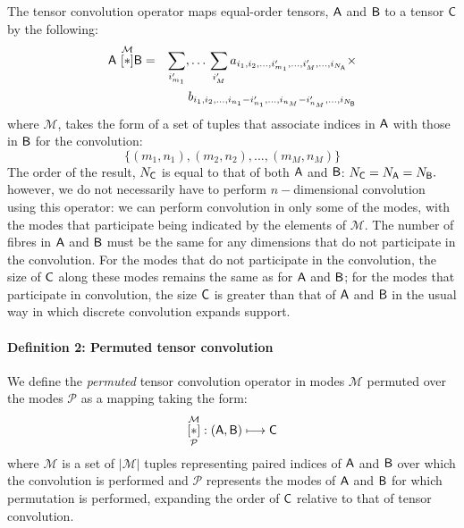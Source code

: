 The tensor convolution operator maps equal-order tensors, $\mathsf{A}$ and $\mathsf{B}$ to a tensor $\mathsf{C}$ by the following:
\begin{eqnarray}
\mathsf{A} \,\, \overset{\mathcal{M}}{[ \ast ]}{\mathsf{B}} &=& \sum_{i'_{m_1}},\ldots\,\sum_{i_{M}'}   a_{i_1,i_2,...,i_{m_1}',...,i_{M}',...,i_{N_{\mathsf{A}}}} \times \nonumber \\
& &b_{i_1,i_2,...,i_{n_1}-i_{n_1}',...,i_{n_M}-i_{n_M}',...,i_{N_{\mathsf{B}}}}
\label{eq:t1}
\end{eqnarray}
where $\mathcal{M}$, takes the form of a set of tuples that associate indices in $\mathsf{A}$ with those in $\mathsf{B}$ for the convolution:
\[
\lbrace(m_1,n_1),(m_2,n_2),...,(m_{M},n_{M})\rbrace
\]
The order of the result, $N_{\mathsf{C}}$ is equal to that of both $\mathsf{A}$ and $\mathsf{B}$:
$N_{\mathsf{C}} = N_{\mathsf{A}} = N_{\mathsf{B}}.$
however, we do not necessarily have to perform $n-$dimensional convolution using this operator: we can perform convolution in only some of the modes, with the modes that participate being indicated by the elements of $\mathcal{M}$.  The number of fibres in $\mathsf{A}$ and $\mathsf{B}$ must be the same for any dimensions that do not participate in the convolution. For the modes that do not participate in the convolution, the size of $\mathsf{C}$ along these modes remains the same as for $\mathsf{A}$ and $\mathsf{B}$; for the modes that participate in convolution, the size $\mathsf{C}$ is greater than that of $\mathsf{A}$ and $\mathsf{B}$ in the usual way in which discrete convolution expands support.\\

\paragraph{Definition 2: Permuted tensor convolution} We define the {\it permuted} tensor convolution operator in modes $\mathcal{M}$ permuted over the modes $\mathcal{P}$ as a mapping taking the form:
\[
 \underset{\mathcal{P}}{\overset{\mathcal{M}}{[ \ast ]}}: \left (\mathsf{A},\mathsf{B}  \right ) \longmapsto \mathsf{C}
\] 
 where $\mathcal{M}$ is a set of $|\mathcal{M}|$ tuples representing paired indices of $\mathsf{A}$ and $\mathsf{B}$ over which the convolution is performed and $\mathcal{P}$ represents the modes of $\mathsf{A}$ and $\mathsf{B}$ for which permutation is performed, expanding the order of $\mathsf{C}$ relative to that of tensor convolution.\\

